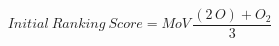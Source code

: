 \documentclass[12pt]{minimal}
\begin{document}
\[Initial\:Ranking\:Score=MoV\,\frac{(2\,O)+O_2}{3}\]
\end{document}
